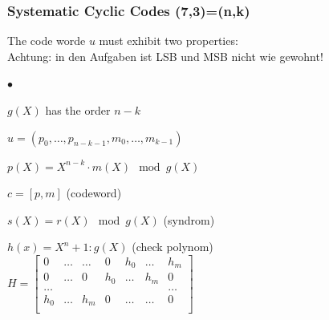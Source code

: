 \subsubsection{Systematic Cyclic Codes (7,3)=(n,k)}
The code worde $u$ must exhibit two properties:\\
Achtung: in den Aufgaben ist LSB und MSB nicht wie gewohnt!\\
\begin{list}{$\bullet$}{\setlength{\itemsep}{0cm} \setlength{\parsep}{0cm} \setlength{\topsep}{0.1cm}} 
  \item $g(X)$ has the order $n-k$
  \item	$u=(p_0,\ldots, p_{n-k-1}, m_0,\ldots,m_{k-1})$
  \item $p(X)=X^{n-k}\cdot m(X) \mod g(X)$
  \item $c=[p,m]$ (codeword)
  \item $s(X)=r(X)\mod g(X)$ (syndrom)
  \item $h(x)=X^n+1 : g(X)$ (check polynom)\\
        $H=\begin{bmatrix} 	
        			0	& \ldots	& \ldots	& 0 	& h_0		&	\ldots	&	h_m \\
        			0	& \ldots	& 0			& h_0	& \ldots	&	h_m		&	0	\\
        			\ldots &		&			&		&			&			&	\ldots \\
        			h_0	&	\ldots	& h_m		& 0		&	\ldots	&	\ldots	& 	0 \\
        \end{bmatrix}$  \\   
\end{list}

